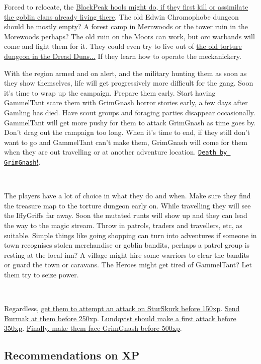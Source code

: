 Forced to relocate, the \hyperref[appendixmountaingoblins]{BlackPeak hools might do, if they first kill or assimilate the goblin clans already living there}. The old Edwin Chromophobe dungeon should be mostly empty? A forest camp in Mernwoods or the tower ruin in the Morewoods perhaps? The old ruin on the Moors can work, but orc warbands will come and fight them for it. They could even try to live out of \hyperref[appendixtorturous]{the old torture dungeon in the Dread Duns...} If they learn how to operate the meckanickery.

With the region armed and on alert, and the military hunting them as soon as they show themselves, life will get progressively more difficult for the gang. Soon it's time to wrap up the campaign. Prepare them early. Start having GammelTant scare them with GrimGnash horror stories early, a few days after Gamling has died. Have scout groups and foraging parties disappear occasionally. GammelTant will get more pushy for them to attack GrimGnash as time goes by. Don't drag out the campaign too long. When it's time to end, if they still don't want to go and GammelTant can't make them, GrimGnash will come for them when they are out travelling or at another adventure location. \hyperref[05deathbygrimgnash]{\texttt{Death by GrimGnash}!}.

\

The players have a lot of choice in what they do and when. Make sure they find the treasure map to the torture dungeon early on. While travelling they will see the IffyGriffs far away. Soon the mutated runts will show up and they can lead the way to the magic stream. Throw in patrols, traders and travellers, etc, as suitable. Simple things like going shopping can turn into adventures if someone in town recognises stolen merchandise or goblin bandits, perhaps a patrol group is resting at the local inn? A village might hire some warriors to clear the bandits or guard the town or caravans. The Heroes might get tired of GammelTant? Let them try to seize power.

\

Regardless, 
\hyperref[02killthebandits]{get them to attempt an attack on SturSkurk before 150xp}. 
\hyperref[03defendhoomhool]{Send Burmak at them before 250xp}. 
\hyperref[03defendhoomhool]{Lundqvist should make a first attack before 350xp}. \hyperref[05deathbygrimgnash]{Finally, make them face GrimGnash before 500xp}.


\subsection*{Recommendations on XP}

